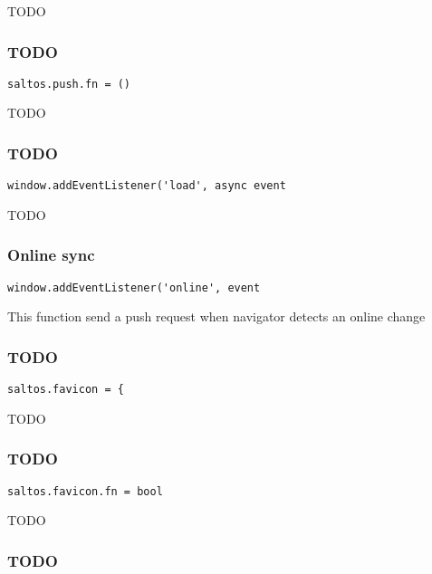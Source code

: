 \documentclass[a4paper]{article}
\begin{document}
TODO

\hypertarget{toc837}{}
\subsubsection{TODO}

\begin{lstlisting}
saltos.push.fn = ()
\end{lstlisting}

TODO

\hypertarget{toc838}{}
\subsubsection{TODO}

\begin{lstlisting}
window.addEventListener('load', async event
\end{lstlisting}

TODO

\hypertarget{toc839}{}
\subsubsection{Online sync}

\begin{lstlisting}
window.addEventListener('online', event
\end{lstlisting}

This function send a push request when navigator detects an online change

\hypertarget{toc840}{}
\subsubsection{TODO}

\begin{lstlisting}
saltos.favicon = {
\end{lstlisting}

TODO

\hypertarget{toc841}{}
\subsubsection{TODO}

\begin{lstlisting}
saltos.favicon.fn = bool
\end{lstlisting}

TODO

\hypertarget{toc842}{}
\subsubsection{TODO}
\end{document}
